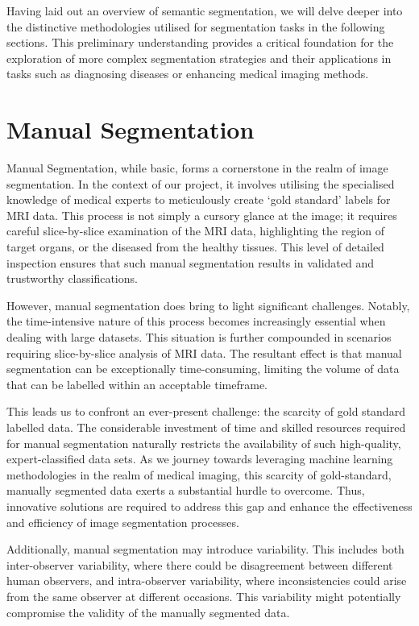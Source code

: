 Having laid out an overview of semantic segmentation, we will delve deeper into the distinctive methodologies utilised for segmentation tasks in the following sections. This preliminary understanding provides a critical foundation for the exploration of more complex segmentation strategies and their applications in tasks such as diagnosing diseases or enhancing medical imaging methods.

\section{Manual Segmentation}
\label{sec:manual-segmentation}

Manual Segmentation, while basic, forms a cornerstone in the realm of image segmentation. In the context of our project, it involves utilising the specialised knowledge of medical experts to meticulously create `gold standard' labels for MRI data. This process is not simply a cursory glance at the image; it requires careful slice-by-slice examination of the MRI data, highlighting the region of target organs, or the diseased from the healthy tissues. This level of detailed inspection ensures that such manual segmentation results in validated and trustworthy classifications.

However, manual segmentation does bring to light significant challenges. Notably, the time-intensive nature of this process becomes increasingly essential when dealing with large datasets. This situation is further compounded in scenarios requiring slice-by-slice analysis of MRI data. The resultant effect is that manual segmentation can be exceptionally time-consuming, limiting the volume of data that can be labelled within an acceptable timeframe.

This leads us to confront an ever-present challenge: the scarcity of gold standard labelled data. The considerable investment of time and skilled resources required for manual segmentation naturally restricts the availability of such high-quality, expert-classified data sets. As we journey towards leveraging machine learning methodologies in the realm of medical imaging, this scarcity of gold-standard, manually segmented data exerts a substantial hurdle to overcome. Thus, innovative solutions are required to address this gap and enhance the effectiveness and efficiency of image segmentation processes.

Additionally, manual segmentation may introduce variability. This includes both inter-observer variability, where there could be disagreement between different human observers, and intra-observer variability, where inconsistencies could arise from the same observer at different occasions. This variability might potentially compromise the validity of the manually segmented data.

